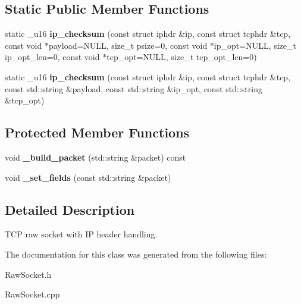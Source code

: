 \subsection*{Static Public Member Functions}
\begin{CompactItemize}
\item 
\hypertarget{classsocketpp_1_1TCP__IP__RawSocket_abc1c7904d5086de03ab11ae151813a7}{
static \_\-u16 \textbf{ip\_\-checksum} (const struct iphdr \&ip, const struct tcphdr \&tcp, const void $\ast$payload=NULL, size\_\-t psize=0, const void $\ast$ip\_\-opt=NULL, size\_\-t ip\_\-opt\_\-len=0, const void $\ast$tcp\_\-opt=NULL, size\_\-t tcp\_\-opt\_\-len=0)}
\label{classsocketpp_1_1TCP__IP__RawSocket_abc1c7904d5086de03ab11ae151813a7}

\item 
\hypertarget{classsocketpp_1_1TCP__IP__RawSocket_1fcccb3c1d1454997c08e7afe1518df7}{
static \_\-u16 \textbf{ip\_\-checksum} (const struct iphdr \&ip, const struct tcphdr \&tcp, const std::string \&payload, const std::string \&ip\_\-opt, const std::string \&tcp\_\-opt)}
\label{classsocketpp_1_1TCP__IP__RawSocket_1fcccb3c1d1454997c08e7afe1518df7}

\end{CompactItemize}
\subsection*{Protected Member Functions}
\begin{CompactItemize}
\item 
\hypertarget{classsocketpp_1_1TCP__IP__RawSocket_e624076d0f5f1f63bd8c13e97a7e46ce}{
void \textbf{\_\-build\_\-packet} (std::string \&packet) const }
\label{classsocketpp_1_1TCP__IP__RawSocket_e624076d0f5f1f63bd8c13e97a7e46ce}

\item 
\hypertarget{classsocketpp_1_1TCP__IP__RawSocket_f8f606ce33835813cc5c3a530e181432}{
void \textbf{\_\-set\_\-fields} (const std::string \&packet)}
\label{classsocketpp_1_1TCP__IP__RawSocket_f8f606ce33835813cc5c3a530e181432}

\end{CompactItemize}


\subsection{Detailed Description}
TCP raw socket with IP header handling. 

The documentation for this class was generated from the following files:\begin{CompactItemize}
\item 
RawSocket.h\item 
RawSocket.cpp\end{CompactItemize}
